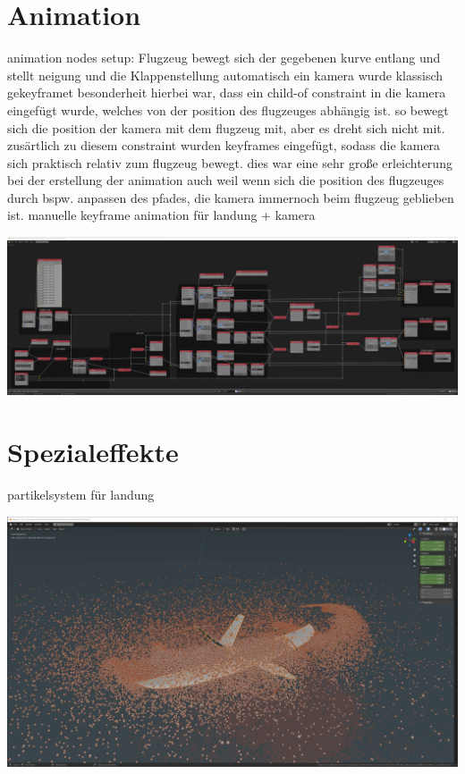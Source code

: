 \section{Animation}

animation nodes setup: Flugzeug bewegt sich der gegebenen kurve entlang und stellt neigung und die Klappenstellung automatisch ein
kamera wurde klassisch gekeyframet
besonderheit hierbei war, dass ein child-of constraint in die kamera eingefügt wurde, welches von der position des flugzeuges abhängig ist.
so bewegt sich die position der kamera mit dem flugzeug mit, aber es dreht sich nicht mit. zusärtlich zu diesem constraint wurden keyframes eingefügt, sodass die kamera sich praktisch relativ zum flugzeug bewegt.
dies war eine sehr große erleichterung bei der erstellung der animation
auch weil wenn sich die position des flugzeuges durch bspw. anpassen des pfades, die kamera immernoch beim flugzeug geblieben ist.
manuelle keyframe animation für landung + kamera

\includegraphics{gfx/prod/plane/animation_nodes.png}

\section{Spezialeffekte}

partikelsystem für landung

\includegraphics{gfx/prod/plane/particles.png}

